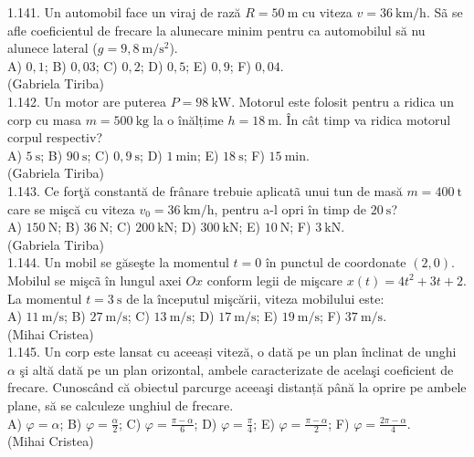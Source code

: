1.141. Un automobil face un viraj de rază $R=50 \mathrm{~m}$ cu viteza $v=36 \mathrm{~km} / \mathrm{h}$. Sã se afle coeficientul de frecare la alunecare minim pentru ca automobilul să nu alunece lateral ($g=9,8 \mathrm{~m} / \mathrm{s}^{2}$).\\ A) $0,1$; B) $0,03$; C) $0,2$; D) $0,5$; E) $0,9$; F) $0,04$.\\ (Gabriela Tiriba)\\

1.142. Un motor are puterea $P=98 \mathrm{~kW}$. Motorul este folosit pentru a ridica un corp cu masa $m=500 \mathrm{~kg}$ la o înălțime $h=18 \mathrm{~m}$. În cât timp va ridica motorul corpul respectiv?\\ A) $5 \mathrm{~s}$; B) $90 \mathrm{~s}$; C) $0,9 \mathrm{~s}$; D) $1 \mathrm{~min}$; E) $18 \mathrm{~s}$; F) $15 \mathrm{~min}$.\\ (Gabriela Tiriba)\\

1.143. Ce forţă constantă de frânare trebuie aplicatã unui tun de masă $m=400 \mathrm{~t}$ care se mişcă cu viteza $v_{0}=36 \mathrm{~km} / \mathrm{h}$, pentru a-l opri în timp de $20 \mathrm{~s}$?\\ A) $150 \mathrm{~N}$; B) $36 \mathrm{~N}$; C) $200 \mathrm{~kN}$; D) $300 \mathrm{~kN}$; E) $10 \mathrm{~N}$; F) $3 \mathrm{~kN}$.\\ (Gabriela Tiriba)\\

1.144. Un mobil se găseşte la momentul $t=0$ în punctul de coordonate $(2,0)$. Mobilul se mişcã în lungul axei $Ox$ conform legii de mişcare $x(t)=4 t^{2}+3 t+2$. La momentul $t=3 \mathrm{~s}$ de la începutul mişcării, viteza mobilului este:\\ A) $11 \mathrm{~m} / \mathrm{s}$; B) $27 \mathrm{~m} / \mathrm{s}$; C) $13 \mathrm{~m} / \mathrm{s}$; D) $17 \mathrm{~m} / \mathrm{s}$; E) $19 \mathrm{~m} / \mathrm{s}$; F) $37 \mathrm{~m} / \mathrm{s}$.\\ (Mihai Cristea)\\

1.145. Un corp este lansat cu aceeași viteză, o dată pe un plan înclinat de unghi $\alpha$ şi altă dată pe un plan orizontal, ambele caracterizate de acelaşi coeficient de frecare. Cunoscând că obiectul parcurge aceeaşi distanță până la oprire pe ambele plane, să se calculeze unghiul de frecare.\\ A) $\varphi=\alpha$; B) $\varphi=\frac{\alpha}{2}$; C) $\varphi=\frac{\pi-\alpha}{6}$; D) $\varphi=\frac{\pi}{4}$; E) $\varphi=\frac{\pi-\alpha}{2}$; F) $\varphi=\frac{2 \pi-\alpha}{4}$.\\ (Mihai Cristea)\\

